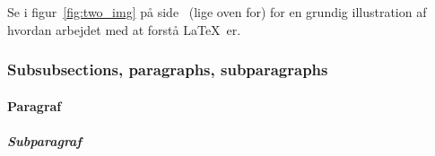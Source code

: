 Se i figur~\ref{fig:two_img} på side~\pageref{fig:two_img} (lige oven for) for en grundig illustration af hvordan arbejdet med at forstå \LaTeX\ er. 

\subsubsection{Subsubsections, paragraphs, subparagraphs}
\label{sec:1.2.1}
\paragraph{Paragraf}
\lipsum[2]
\subparagraph{Subparagraf}
\lipsum[2]






